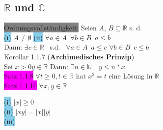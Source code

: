 \documentclass[landscape, 10pt]{article}
\newcommand{\R}{\mathbb{R}}
\newcommand{\N}{\mathbb{N}}
\newcommand{\C}{\mathbb{C}}
\begin{document}
\pagestyle{fancy}
\fancyhf{}
\cfoot{\thepage}

\begin{multicols}{3}
\section{$\R$ und $\C$}
              \colorbox{gray}{Ordnungsvollständigkeit:}
                     Seien \textcolor{NavyBlue}{$A$}, 
                     \textcolor{NavyBlue}{$B\subseteq\R$} s. d.\\
                     \colorbox{SkyBlue}{(i)} 
                            \textcolor{NavyBlue}{$A\neq\emptyset$} \qquad
                     \colorbox{SkyBlue}{(ii)} 
                            \textcolor{NavyBlue}{
                            $\forall a\in A \enspace \forall b 
                            \in B \enspace a \leqslant b$} \\
                      Dann: \textcolor{NavyBlue}{
                     $\exists c\in\R\enspace$} s.d. 
                     \textcolor{NavyBlue}{
                     $\enspace\forall a\in A\enspace a\leqslant c$
                     $\forall b\in B\enspace c\leqslant b$}\\
              \colorbox{BurntOrange}{Korollar 1.1.7} 
              (\textbf{Archimedisches Prinzip})\\
                     Sei \textcolor{NavyBlue}{$x>0 y\in\R$}
                     \quad Dann: \textcolor{NavyBlue}{
                     $\exists n\in \N \quad y\leqslant n*x$}\\
              \colorbox{magenta}{Satz 1.1.8} \textcolor{NavyBlue}{
                     $\forall t\geqslant 0, t\in\R$} hat \textcolor{NavyBlue}{$x^2=t$} 
                     eine Lösung in $\R$\\
              \colorbox{magenta}{Satz 1.1.10} 
                     \textcolor{NavyBlue}{$\forall x,y\in\R$}
                     \begin{multicols}{2}
                     \colorbox{SkyBlue}{(i)} 
                            \textcolor{NavyBlue}{$|x|\geqslant 0$} \\
                     \colorbox{SkyBlue}{(ii)} 
                            \textcolor{NavyBlue}{$|xy|=|x||y|$}\\
                     \colorbox{SkyBlue}{(iii)}

\end{multicols}
\end{multicols}
\end{document}
